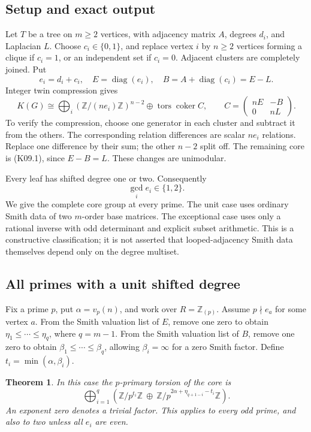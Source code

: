 \documentclass[11pt,a4paper]{article}
\newtheorem{theorem}{Theorem}[section]
\theoremstyle{definition}\newtheorem{definition}[theorem]{Definition}
\theoremstyle{remark}\newtheorem{remark}[theorem]{Remark}
\newcommand{\Z}{\mathbb Z}\newcommand{\Q}{\mathbb Q}\newcommand{\F}{\mathbb F}
\DeclareMathOperator{\coker}{coker}\DeclareMathOperator{\diag}{diag}\DeclareMathOperator{\rank}{rank}
\numberwithin{equation}{section}
\begin{document}
\subsection{Setup and exact output}\label{K09-sec-1}
Let $T$ be a tree on $m\geq2$ vertices, with adjacency matrix $A$, degrees $d_i$, and Laplacian $L$. Choose $c_i\in\{0,1\}$, and replace vertex $i$ by $n\geq2$ vertices forming a clique if $c_i=1$, or an independent set if $c_i=0$. Adjacent clusters are completely joined. Put
\[
 e_i=d_i+c_i,\quad E=\diag(e_i),\quad B=A+\diag(c_i)=E-L.
\]
Integer twin compression gives
\[
 K(G)\cong\bigoplus_i(\Z/(ne_i)\Z)^{n-2}
           \oplus\operatorname{tors}\coker C,
 \qquad C=\begin{pmatrix}nE&-B\\0&nL\end{pmatrix}.          \tag{K09.1}
\]
To verify the compression, choose one generator in each cluster and subtract it from the others. The corresponding relation differences are scalar $ne_i$ relations. Replace one difference by their sum; the other $n-2$ split off. The remaining core is (K09.1), since $E-B=L$. These changes are unimodular.

Every leaf has shifted degree one or two. Consequently
\[
 \gcd_i e_i\in\{1,2\}.                                    \tag{K09.2}
\]
We give the complete core group at every prime. The unit case uses ordinary Smith data of two $m$-order base matrices. The exceptional case uses only a rational inverse with odd determinant and explicit subset arithmetic. This is a constructive classification; it is not asserted that looped-adjacency Smith data themselves depend only on the degree multiset.

\subsection{All primes with a unit shifted degree}\label{K09-sec-2}
Fix a prime $p$, put $\alpha=v_p(n)$, and work over $R=\Z_{(p)}$. Assume $p\nmid e_a$ for some vertex $a$. From the Smith valuation list of $E$, remove one zero to obtain
$\eta_1\leq\cdots\leq\eta_q$, where $q=m-1$. From the Smith valuation list of $B$, remove one zero to obtain $\beta_1\leq\cdots\leq\beta_q$, allowing $\beta_i=\infty$ for a zero Smith factor. Define $t_i=\min(\alpha,\beta_i)$.
\begin{theorem}\label{K09-unit}
In this case the $p$-primary torsion of the core is
\[
 \bigoplus_{i=1}^q\left(
 \Z/p^{t_i}\Z\ \oplus\ \Z/p^{2\alpha+\eta_{q+1-i}-t_i}\Z
                       \right).                            \tag{K09.3}
\]
An exponent zero denotes a trivial factor. This applies to every odd prime, and also to two unless all $e_i$ are even.
\end{theorem}
\end{document}
